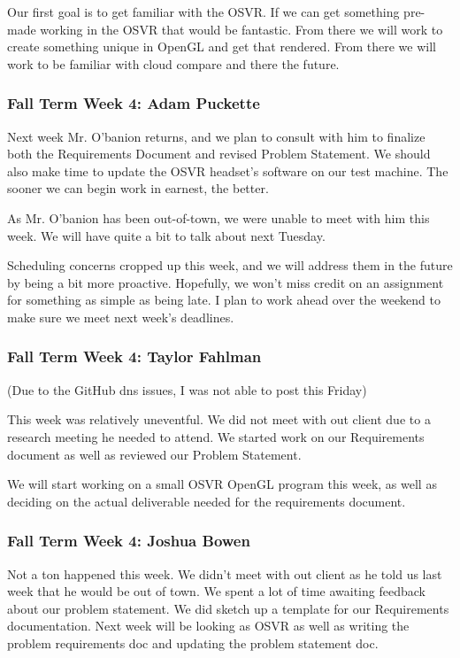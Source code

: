 \documentclass[draftclsnofoot,onecolumn]{IEEEtran}
\begin{document}
Our first goal is to get familiar with the OSVR. 
If we can get something pre-made working in the OSVR that would be fantastic. 
From there we will work to create something unique in OpenGL and get that rendered. From there we will work to be familiar with cloud compare and there the future.

\subsubsection{Fall Term Week 4: Adam Puckette}

Next week Mr. O'banion returns, and we plan to consult with him to finalize both the Requirements Document and revised Problem Statement. We should also make time to update the OSVR headset's software on our test machine. The sooner we can begin work in earnest, the better.

As Mr. O'banion has been out-of-town, we were unable to meet with him this week. We will have quite a bit to talk about next Tuesday.

Scheduling concerns cropped up this week, and we will address them in the future by being a bit more proactive. Hopefully, we won't miss credit on an assignment for something as simple as being late. I plan to work ahead over the weekend to make sure we meet next week's deadlines.

\subsubsection{Fall Term Week 4: Taylor Fahlman}

(Due to the GitHub dns issues, I was not able to post this Friday)

This week was relatively uneventful. We did not meet with out client due to a research meeting he needed to attend. We started work on our Requirements document as well as reviewed our Problem Statement.

We will start working on a small OSVR OpenGL program this week, as well as deciding on the actual deliverable needed for the requirements document.

\subsubsection{Fall Term Week 4: Joshua Bowen}

Not a ton happened this week. We didn't meet with out client as he told us last week that he would be out of town. We spent a lot of time awaiting feedback about our problem statement. We did sketch up a template for our Requirements documentation. Next week will be looking as OSVR as well as writing the problem requirements doc and updating the problem statement doc.
\end{document}
